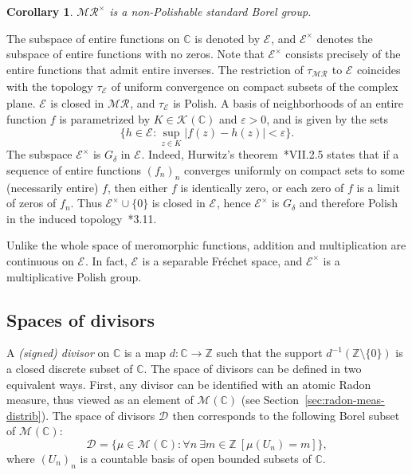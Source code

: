 \documentclass[12pt]{paper}
\numberwithin{equation}{section}
\theoremstyle{plain}
\newtheorem{corollary}[theorem]{Corollary}
\theoremstyle{definition}
\newcommand{\C}{\mathbb{C}}
\newcommand{\Z}{\mathbb{Z}}
\newcommand{\vietoris}[2][]{\mathcal{K}_{#1}(#2)}
\newcommand{\meas}[2][]{\mathcal{M}_{#1}(#2)}
\newcommand{\merom}[1][]{\mathcal{MR}_{#1}}
\newcommand{\meromnz}{\merom^{\times}}
\newcommand{\holomnz}[1][]{\mathcal{E}^{\times}_{#1}}
\newcommand{\holom}[1][]{\mathcal{E}_{#1}}
\newcommand{\divis}[1][]{\mathcal{D}_{#1}}
\renewcommand{\epsilon}{\varepsilon}
\begin{document}
\begin{corollary}
  \label{cor:meromnz-standard-borel-group}
  \(\meromnz\) is a non-Polishable standard Borel group.
\end{corollary}

The subspace of entire functions on \(\C\) is denoted by \(\holom\), and \(\holomnz\) denotes the
subspace of entire functions with no zeros.  Note that \(\holomnz\) consists precisely of the entire
functions that admit entire inverses.  The restriction of \(\tau_{\merom}\) to \(\holom\) coincides
with the topology \(\tau_{\holom}\) of uniform convergence on compact subsets of the complex plane.
\(\holom\) is closed in \(\merom\), and \(\tau_{\holom}\) is Polish.  A basis of neighborhoods of an
entire function \(f\) is parametrized by \(K \in \vietoris{\C}\) and \(\epsilon > 0\), and is given
by the sets
\[\{h \in \holom : \sup_{z \in K} |f(z) - h(z)| < \epsilon\}.\]
The subspace \(\holomnz\) is \(G_{\delta}\) in \(\holom\).  Indeed, Hurwitz's
theorem~\cite{conwayFunctionsOneComplex1978}*{VII.2.5} states that if a sequence of entire functions
\((f_{n})_{n}\) converges uniformly on compact sets to some (necessarily entire) \(f\), then either
\(f\) is identically zero, or each zero of \(f\) is a limit of zeros of \(f_{n}\).  Thus
\(\holomnz \cup \{0\}\) is closed in \(\holom\), hence \(\holomnz\) is \(G_{\delta}\) and therefore
Polish in the induced topology~\cite{Kechris}*{3.11}.

Unlike the whole space of meromorphic functions, addition and multiplication are continuous on
\(\holom\).  In fact, \(\holom\) is a separable Fr\'echet space, and \(\holomnz\) is a
multiplicative Polish group.


\subsection{Spaces of divisors}
\label{sec:divisors}

A \emph{(signed) divisor} on \(\C\) is a map \(d : \C \to \Z\) such that the support
\(d^{-1}(\Z \setminus \{0\}) \) is a closed discrete subset of \(\C\).  The space of divisors can be
defined in two equivalent ways.  First, any divisor can be identified with an atomic Radon measure,
thus viewed as an element of \(\meas{\C}\) (see Section~\ref{sec:radon-meas-distrib}).  The space of
divisors \(\divis\) then corresponds to the following Borel subset of \(\meas{\C}\):
\[\divis = \{\mu \in \meas{\C} : \forall n\
  \exists m \in \Z\ [\mu(U_{n}) = m]\},\]
where \((U_{n})_{n}\) is a countable basis of open bounded subsets of \(\C\).
\end{document}
